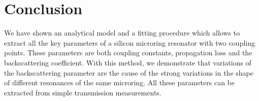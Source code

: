 \documentclass[conference,letterpaper,final]{IEEEtran}
\begin{document}
\section{Conclusion}
We have shown an analytical model and a fitting procedure which allows to extract all the key parameters of a silicon microring resonator with two coupling points. These parameters are both coupling constants, propagation loss and the backscattering coefficient. With this method, we demonstrate that variations of the backscattering parameter are the cause of the strong variations in the shape of different resonances of the same microring. All these parameters can be extracted from simple transmission measurements.




%
%
\end{document}
